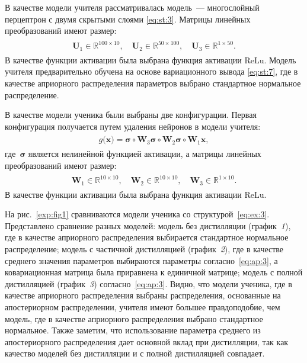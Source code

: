 \documentclass[12pt]{a&t}
\begin{document}
В качестве модели учителя рассматривалась модель~--- многослойный перцептрон с двумя скрытыми слоями \eqref{eq:st:3}. Матрицы линейных преобразований имеют размер:
\begin{gather}
\label{eq:ex:2}
\begin{aligned}
\mathbf{U}_{1} \in \mathbb{R}^{100 \times 10}, \quad \mathbf{U}_{2} \in \mathbb{R}^{50 \times 100}, \quad \mathbf{U}_{3} \in \mathbb{R}^{1 \times 50}.
\end{aligned}
\end{gather}
В качестве функции активации была выбрана функция активации $\text{ReLu}$.
Модель учителя предварительно обучена на основе вариационного вывода \eqref{eq:st:7}, где в качестве априорного распределения параметров выбрано стандартное нормальное распределение.

В качестве модели ученика были выбраны две конфигурации. Первая конфигурация получается путем удаления нейронов в модели учителя:
\begin{gather}
\label{eq:ex:3}
\begin{aligned}
g\bigr(\mathbf{x}\bigr) = \bm{\sigma} \circ \mathbf{W}_3\bm{\sigma} \circ \mathbf{W}_2\bm{\sigma} \circ \mathbf{W}_1\mathbf{x},
\end{aligned}
\end{gather}
где~$\bm{\sigma}$ является нелинейной функцией активации, а матрицы линейных преобразований имеют размер:
\begin{gather}
\label{eq:ex:4}
\begin{aligned}
\mathbf{W}_{1} \in \mathbb{R}^{10 \times 10}, \quad \mathbf{W}_{2} \in \mathbb{R}^{10 \times 10},  \quad \mathbf{W}_{3} \in \mathbb{R}^{1 \times 10}.
\end{aligned}
\end{gather}
В качестве функции активации была выбрана функция активации $\text{ReLu}$.


На рис.~\ref{exp:fig1} сравниваются модели ученика со структурой~\eqref{eq:ex:3}. Представлено сравнение разных моделей: модель без дистилляции (график~\textit{1}), где в качестве априорного распределения выбирается стандартное нормальное распределение; модель с частичной дистилляцией (график~\textit{2}), где в качестве среднего значения параметров выбираются параметры согласно~\eqref{eq:ap:3}, а ковариационная матрица была приравнена к единичной матрице; модель с полной дистилляцией (график~\textit{3}) согласно~\eqref{eq:ap:3}. Видно, что модели ученика, где в качестве априорного распределения выбраны распределения, основанные на апостериорном распределении, учителя имеют большее правдоподобие, чем модель, где в качестве априорного распределения выбрано стандартное нормальное. Также заметим, что использование параметра среднего из апостериорного распределения дает основной вклад при дистилляции, так как качество моделей без дистилляции и с полной дистилляцией совпадает.
\end{document}
